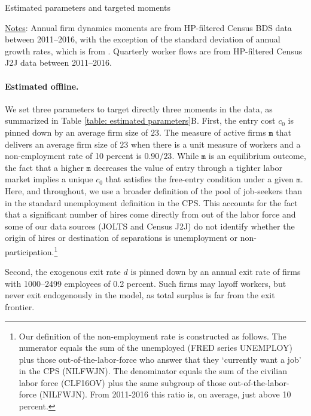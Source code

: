 \begin{table}[ttt]
\begin{center}
\scalebox{0.7}{

}
\caption{Estimated parameters and targeted moments} \label{table: estimated parameters}
\vspace*{-.3cm}
\end{center}
\footnotesize{\underline{Notes}:
Annual firm dynamics moments are from HP-filtered Census BDS data between 2011--2016, with the exception of the standard deviation of annual growth rates, which is from \citet{ElsbyMichaelsAEJ}. Quarterly worker flows are from HP-filtered Census J2J data between 2011--2016.}
\end{table}

\paragraph{Estimated offline.}
We set three parameters to target directly three moments in the data, as summarized in Table \ref{table: estimated parameters}B.
First, the entry cost $c_0$ is pinned down by an average firm size of $23$.
The measure of active firms $\mathtt{m}$ that delivers an average firm size of $23$ when there is a unit measure of workers and a non-employment rate of 10 percent is $0.90/23$.
While $\mathtt{m}$ is an equilibrium outcome, the fact that a higher $\mathtt{m}$ decreases the value of entry through a tighter labor market implies a unique $c_0$ that satisfies the free-entry condition under a given $\mathtt{m}$.
Here, and throughout, we use a broader definition of the pool of job-seekers than in the standard unemployment definition in the CPS.
This accounts for the fact that a significant number of hires come directly from out of the labor force and some of our data sources (JOLTS and Census J2J) do not identify whether the origin of hires or destination of separations is unemployment or non-participation.\footnote{
    Our definition of the non-employment rate is constructed as follows.
    The numerator equals the sum of the unemployed (FRED series UNEMPLOY) plus those out-of-the-labor-force who answer that they `currently want a job' in the CPS (NILFWJN).
    The denominator equals the sum of the civilian labor force (CLF16OV) plus the same subgroup of those out-of-the-labor-force (NILFWJN).
    From 2011-2016 this ratio is, on average, just above 10 percent.}

Second, the exogenous exit rate $d$ is pinned down by an annual exit rate of firms with 1000--2499 employees of 0.2 percent.
Such firms may layoff workers, but never exit endogenously in the model, as total surplus is far from the exit frontier.

